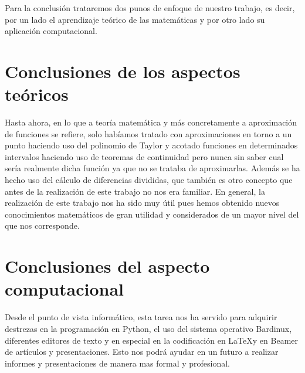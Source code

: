 
Para la conclusión trataremos dos punos de enfoque de nuestro trabajo, es decir, por un lado el aprendizaje teórico de las matemáticas y por otro lado su aplicación computacional.
\section{Conclusiones de los aspectos teóricos}
\label{4.1}
Hasta ahora, en lo que a teoría matemática y más concretamente a aproximación de funciones se refiere, solo habíamos tratado con aproximaciones en torno a un punto haciendo uso del polinomio de Taylor y acotado funciones en determinados intervalos haciendo uso de teoremas de continuidad pero nunca sin saber cual sería realmente dicha función ya que no se trataba de aproximarlas. Además se ha hecho uso del cálculo de diferencias divididas, que también es otro concepto que antes de la realización de este trabajo no nos era familiar. En general, la realización de este trabajo nos ha sido muy útil pues hemos obtenido nuevos conocimientos matemáticos de gran utilidad y considerados de un mayor nivel del que nos corresponde.



\section{Conclusiones del aspecto computacional}
\label{4.2}
Desde el punto de vista informático, esta tarea nos ha servido para adquirir destrezas en la programación en Python, el uso del sistema operativo Bardinux, diferentes editores de texto y en especial en la codificación en \LaTeX y en Beamer de artículos y presentaciones. Esto nos podrá ayudar en un futuro a realizar informes y presentaciones de manera mas formal y profesional.
